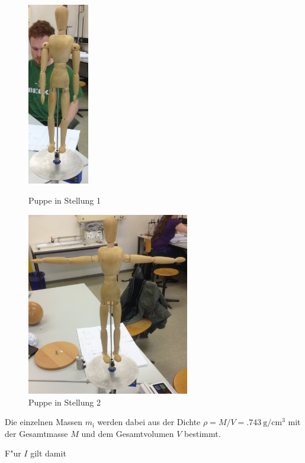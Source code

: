 				\begin{figure}[h]
					\begin{minipage}[t]{7cm}
						\vspace{0pt}
						\centering
						\includegraphics[height = 8cm]{img/pupp1.jpg}
						\caption{Puppe in Stellung 1}
						\label{fig:puppe1}
					\end{minipage}
					\hfill
					\begin{minipage}[t]{7cm}
						\vspace{0pt}
						\centering
						\includegraphics[height = 8cm]{img/pupp2.jpg}
						\caption{Puppe in Stellung 2}
						\label{fig:puppe2}
					\end{minipage}
				\end{figure}

				Die einzelnen Massen $m_\mathrm{i}$ werden dabei aus der Dichte $\rho = M / V = \SI{.743}{\gram \per \centi \meter \cubed}$ mit der Gesamtmasse $M$ und dem Gesamtvolumen $V$ bestimmt.

				F"ur $I$ gilt damit

